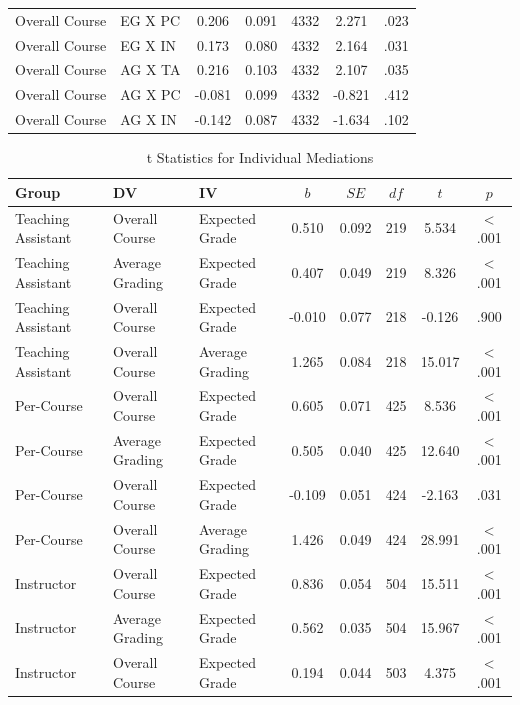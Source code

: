 \documentclass[man]{apa6}
\theoremstyle{definition}
\theoremstyle{definition}
\theoremstyle{definition}
\theoremstyle{remark}
\begin{document}
\begin{table}[tbp]
\begin{center}
\begin{threeparttable}
{\begin{tabular}{llccccc}
Overall Course & EG X PC & 0.206 & 0.091 & 4332 & 2.271 & .023\\
Overall Course & EG X IN & 0.173 & 0.080 & 4332 & 2.164 & .031\\
Overall Course & AG X TA & 0.216 & 0.103 & 4332 & 2.107 & .035\\
Overall Course & AG X PC & -0.081 & 0.099 & 4332 & -0.821 & .412\\
Overall Course & AG X IN & -0.142 & 0.087 & 4332 & -1.634 & .102\\
\bottomrule
\end{tabular}
}
\end{threeparttable}
\end{center}
\end{table}

\begin{table}[tbp]
\begin{center}
\begin{threeparttable}
\caption{\label{tab:table-med-split}t Statistics for Individual Mediations}
\begin{tabular}{lllccccc}
\toprule
Group & DV & IV & $b$ & $SE$ & $df$ & $t$ & $p$\\
\midrule
Teaching Assistant & Overall Course & Expected Grade & 0.510 & 0.092 & 219 & 5.534 & < .001\\
Teaching Assistant & Average Grading & Expected Grade & 0.407 & 0.049 & 219 & 8.326 & < .001\\
Teaching Assistant & Overall Course & Expected Grade & -0.010 & 0.077 & 218 & -0.126 & .900\\
Teaching Assistant & Overall Course & Average Grading & 1.265 & 0.084 & 218 & 15.017 & < .001\\
Per-Course & Overall Course & Expected Grade & 0.605 & 0.071 & 425 & 8.536 & < .001\\
Per-Course & Average Grading & Expected Grade & 0.505 & 0.040 & 425 & 12.640 & < .001\\
Per-Course & Overall Course & Expected Grade & -0.109 & 0.051 & 424 & -2.163 & .031\\
Per-Course & Overall Course & Average Grading & 1.426 & 0.049 & 424 & 28.991 & < .001\\
Instructor & Overall Course & Expected Grade & 0.836 & 0.054 & 504 & 15.511 & < .001\\
Instructor & Average Grading & Expected Grade & 0.562 & 0.035 & 504 & 15.967 & < .001\\
Instructor & Overall Course & Expected Grade & 0.194 & 0.044 & 503 & 4.375 & < .001\\

\end{tabular}
\end{threeparttable}
\end{center}
\end{table}
\end{document}

